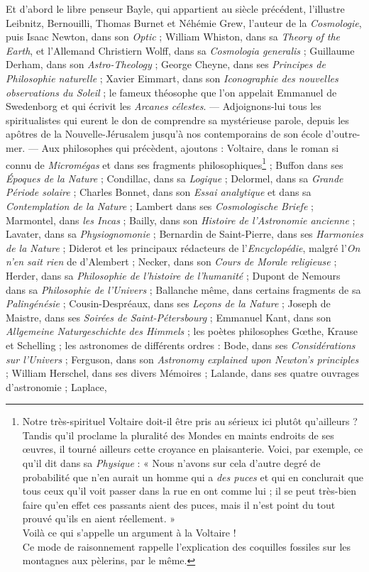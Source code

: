 \documentclass[a4paper, 11pt, oneside, landscape]{article}
\begin{document}
Et d'abord le libre penseur Bayle, qui appartient au siècle précédent, l'illustre Leibnitz, Bernouilli, Thomas Burnet et Néhémie Grew, l'auteur de la \emph{Cosmologie}, puis Isaac Newton, dans son \emph{Optic} ; William Whiston, dans sa \emph{Theory of the Earth}, et l'Allemand Christiern Wolff, dans sa \emph{Cosmologia generalis} ; Guillaume Derham, dans son \emph{Astro-Theology} ; George Cheyne, dans ses \emph{Principes de Philosophie naturelle} ; Xavier Eimmart, dans son \emph{Iconographie des nouvelles observations du Soleil} ; le fameux théosophe que l'on appelait Emmanuel de Swedenborg et qui écrivit les \emph{Arcanes célestes}. --- Adjoignons-lui tous les spiritualistes qui eurent le don de comprendre sa mystérieuse parole, depuis les apôtres de la Nouvelle-Jérusalem jusqu'à nos contemporains de son école d'outre-mer. --- Aux philosophes qui précèdent, ajoutons : Voltaire, dans le roman si connu de \emph{Micromégas} et dans ses fragments philosophiques\footnote{Notre très-spirituel Voltaire doit-il être pris au sérieux ici plutôt qu'ailleurs ? Tandis qu'il proclame la pluralité des Mondes en maints endroits de ses œuvres, il tourné ailleurs cette croyance en plaisanterie. Voici, par exemple, ce qu'il dit dans sa \emph{Physique} : « Nous n'avons sur cela d'autre degré de probabilité que n'en aurait un homme qui a \emph{des puces} et qui en conclurait que tous ceux qu'il voit passer dans la rue en ont comme lui ; il se peut très-bien faire qu'en effet ces passants aient des puces, mais il n'est point du tout prouvé qu'ils en aient réellement. »\\\hspace*{5mm}Voilà ce qui s'appelle un argument à la Voltaire !\\\hspace*{5mm}Ce mode de raisonnement rappelle l'explication des coquilles fossiles sur les montagnes aux pèlerins, par le même.} ; Buffon dans ses \emph{Époques de la Nature} ; Condillac, dans sa \emph{Logique} ; Delormel, dans sa \emph{Grande Période solaire} ; Charles Bonnet, dans son \emph{Essai analytique} et dans sa \emph{Contemplation de la Nature} ; Lambert dans ses \emph{Cosmologische Briefe} ; Marmontel, dans \emph{les Incas} ; Bailly, dans son \emph{Histoire de l'Astronomie ancienne} ; Lavater, dans sa \emph{Physiognomonie} ; Bernardin de Saint-Pierre, dans ses \emph{Harmonies de la Nature} ; Diderot et les principaux rédacteurs de l'\emph{Encyclopédie}, malgré l'\emph{On n'en sait rien} de d'Alembert ; Necker, dans son \emph{Cours de Morale religieuse} ; Herder, dans sa \emph{Philosophie de l'histoire de l'humanité} ; Dupont de Nemours dans sa \emph{Philosophie de l'Univers} ; Ballanche même, dans certains fragments de sa \emph{Palingénésie} ; Cousin-Despréaux, dans ses \emph{Leçons de la Nature} ; Joseph de Maistre, dans ses \emph{Soirées de Saint-Pétersbourg} ; Emmanuel Kant, dans son \emph{Allgemeine Naturgeschichte des Himmels} ; les poètes philosophes Gœthe, Krause et Schelling ; les astronomes de différents ordres : Bode, dans ses \emph{Considérations sur l'Univers} ; Ferguson, dans son \emph{Astronomy explained upon Newton's principles} ; William Herschel, dans ses divers Mémoires ; Lalande, dans ses quatre ouvrages d'astronomie ; Laplace, 
\end{document}
